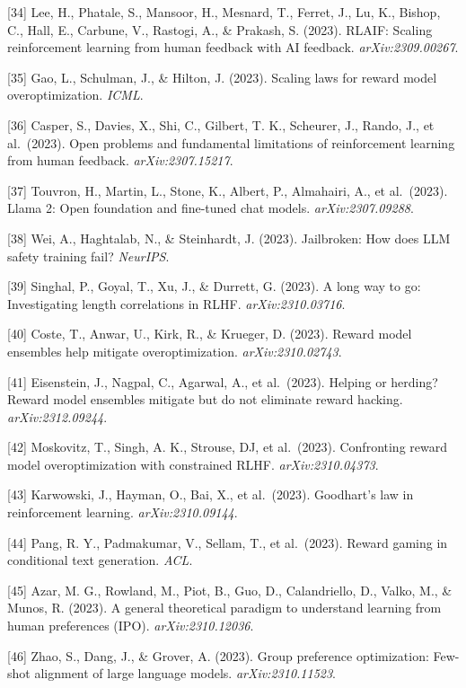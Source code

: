 {[}34{]} Lee, H., Phatale, S., Mansoor, H., Mesnard, T., Ferret, J., Lu, K., Bishop, C., Hall, E., Carbune, V., Rastogi, A., \& Prakash, S. (2023). RLAIF: Scaling reinforcement learning from human feedback with AI feedback. \emph{arXiv:2309.00267}.

{[}35{]} Gao, L., Schulman, J., \& Hilton, J. (2023). Scaling laws for reward model overoptimization. \emph{ICML}.

{[}36{]} Casper, S., Davies, X., Shi, C., Gilbert, T. K., Scheurer, J., Rando, J., et al.~(2023). Open problems and fundamental limitations of reinforcement learning from human feedback. \emph{arXiv:2307.15217}.

{[}37{]} Touvron, H., Martin, L., Stone, K., Albert, P., Almahairi, A., et al.~(2023). Llama 2: Open foundation and fine-tuned chat models. \emph{arXiv:2307.09288}.

{[}38{]} Wei, A., Haghtalab, N., \& Steinhardt, J. (2023). Jailbroken: How does LLM safety training fail? \emph{NeurIPS}.

{[}39{]} Singhal, P., Goyal, T., Xu, J., \& Durrett, G. (2023). A long way to go: Investigating length correlations in RLHF. \emph{arXiv:2310.03716}.

{[}40{]} Coste, T., Anwar, U., Kirk, R., \& Krueger, D. (2023). Reward model ensembles help mitigate overoptimization. \emph{arXiv:2310.02743}.

{[}41{]} Eisenstein, J., Nagpal, C., Agarwal, A., et al.~(2023). Helping or herding? Reward model ensembles mitigate but do not eliminate reward hacking. \emph{arXiv:2312.09244}.

{[}42{]} Moskovitz, T., Singh, A. K., Strouse, DJ, et al.~(2023). Confronting reward model overoptimization with constrained RLHF. \emph{arXiv:2310.04373}.

{[}43{]} Karwowski, J., Hayman, O., Bai, X., et al.~(2023). Goodhart's law in reinforcement learning. \emph{arXiv:2310.09144}.

{[}44{]} Pang, R. Y., Padmakumar, V., Sellam, T., et al.~(2023). Reward gaming in conditional text generation. \emph{ACL}.

{[}45{]} Azar, M. G., Rowland, M., Piot, B., Guo, D., Calandriello, D., Valko, M., \& Munos, R. (2023). A general theoretical paradigm to understand learning from human preferences (IPO). \emph{arXiv:2310.12036}.

{[}46{]} Zhao, S., Dang, J., \& Grover, A. (2023). Group preference optimization: Few-shot alignment of large language models. \emph{arXiv:2310.11523}.

